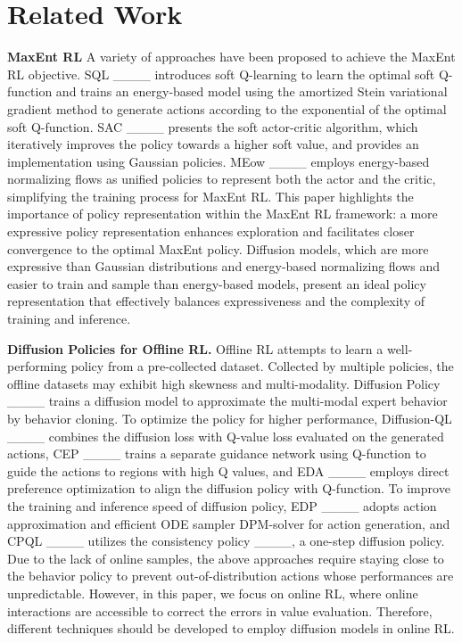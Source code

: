 \section{Related Work}
\textbf{MaxEnt RL}
A variety of approaches have been proposed to achieve the MaxEnt RL objective. SQL ____ introduces soft Q-learning to learn the optimal soft Q-function and trains an energy-based model using the amortized Stein variational gradient method to generate actions according to the exponential of the optimal soft Q-function. SAC ____ presents the soft actor-critic algorithm, which iteratively improves the policy towards a higher soft value, and provides an implementation using Gaussian policies. MEow ____ employs energy-based normalizing flows as unified policies to represent both the actor and the critic, simplifying the training process for MaxEnt RL. This paper highlights the importance of policy representation within the MaxEnt RL framework: a more expressive policy representation enhances exploration and facilitates closer convergence to the optimal MaxEnt policy. Diffusion models, which are more expressive than Gaussian distributions and energy-based normalizing flows and easier to train and sample than energy-based models, present an ideal policy representation that effectively balances expressiveness and the complexity of training and inference.


\textbf{Diffusion Policies for Offline RL.} Offline RL attempts to learn a well-performing policy from a pre-collected dataset. Collected by multiple policies, the offline datasets may exhibit high skewness and multi-modality. Diffusion Policy ____ trains a diffusion model to approximate the multi-modal expert behavior by behavior cloning. To optimize the policy for higher performance, Diffusion-QL ____ combines the diffusion loss with Q-value loss evaluated on the generated actions, CEP ____ trains a separate guidance network using Q-function to guide the actions to regions with high Q values, and EDA ____ employs direct preference optimization to align the diffusion policy with Q-function. To improve the training and inference speed of diffusion policy, EDP ____ adopts action approximation and efficient ODE sampler DPM-solver for action generation, and CPQL ____ utilizes the consistency policy ____, a one-step diffusion policy. Due to the lack of online samples, the above approaches require staying close to the behavior policy to prevent out-of-distribution actions whose performances are unpredictable. However, in this paper, we focus on online RL, where online interactions are accessible to correct the errors in value evaluation. Therefore, different techniques should be developed to employ diffusion models in online RL.

